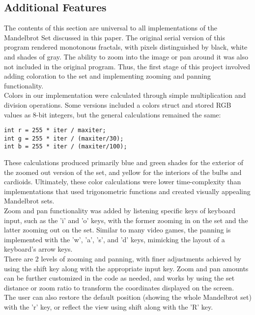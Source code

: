 \documentclass{article}
\begin{document}
\subsection{Additional Features}

The contents of this section are universal to all implementations of the Mandelbrot Set discussed in this paper.
The original serial version of this program rendered monotonous fractals, with pixels distinguished by black, white and shades of gray.
The ability to zoom into the image or pan around it was also not included in the original program.
Thus, the first stage of this project involved adding coloration to the set and implementing zooming and panning functionality.\\

Colors in our implementation were calculated through simple multiplication and division operations.
Some versions included a colors struct and stored RGB values as 8-bit integers, but the general calculations remained the same:

\begin{verbatim}
int r = 255 * iter / maxiter;
int g = 255 * iter / (maxiter/30);
int b = 255 * iter / (maxiter/100);
\end{verbatim}

These calculations produced primarily blue and green shades for the exterior of the zoomed out version of the set, and yellow for the interiors of the bulbs and cardioids.
Ultimately, these color calculations were lower time-complexity than implementations that used trigonometric functions and created visually appealing Mandelbrot sets.\\

Zoom and pan functionality was added by listening specific keys of keyboard input, such as the 'i' and 'o' keys, with the former zooming in on the set and the latter zooming out on the set.
Similar to many video games, the panning is implemented with the 'w', 'a', 's', and 'd' keys, mimicking the layout of a keyboard's arrow keys.\\

There are 2 levels of zooming and panning, with finer adjustments achieved by using the shift key along with the appropriate input key.
Zoom and pan amounts can be further customized in the code as needed, and works by using the set distance or zoom ratio to transform the coordinates displayed on the screen.\\

The user can also restore the default position (showing the whole Mandelbrot set) with the 'r' key, or reflect the view using shift along with the 'R' key.
\end{document}
